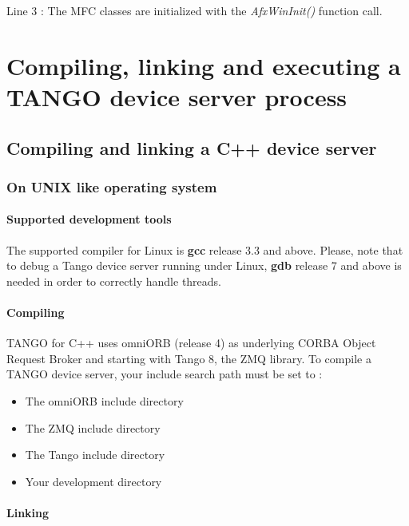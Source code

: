 Line 3 : The MFC classes are initialized with the \emph{AfxWinInit()}
function call.

\section{Compiling, linking and executing a TANGO device server process\label{sec:Compiling,-linking-and}}

\subsection{Compiling and linking a C++ device server}

\subsubsection{On UNIX like operating system }

\paragraph{Supported development tools}

The supported compiler for Linux is \textbf{gcc} release
3.3 and above. Please, note that to debug a Tango device server running
under Linux, \textbf{gdb} release 7 and
above is needed in order to correctly handle threads.

\paragraph{Compiling}

TANGO for C++ uses omniORB (release 4) as underlying CORBA Object
Request Broker \cite{OOC page} and starting with Tango 8, the ZMQ
library. To compile a TANGO device server, your include search path
must be set to :
\begin{itemize}
\item The omniORB include directory
\item The ZMQ include directory
\item The Tango include directory
\item Your development directory
\end{itemize}

\paragraph{Linking }

